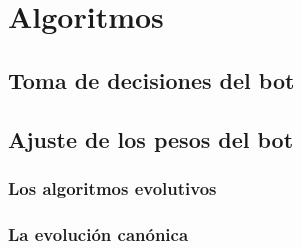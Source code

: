\chapter{Algoritmos}


\section{Toma de decisiones del bot}


\section{Ajuste de los pesos del bot}


\subsection{Los algoritmos evolutivos}


\subsection{La evolución canónica}